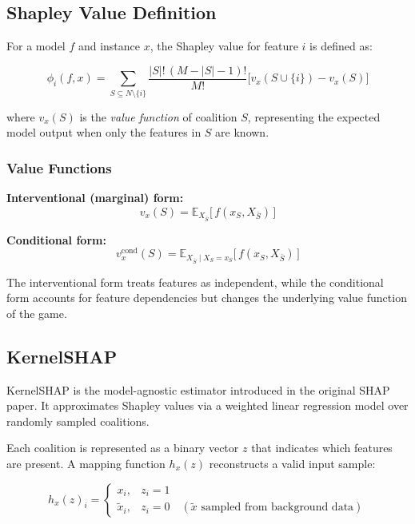 \subsection{Shapley Value Definition}

For a model $f$ and instance $x$, the Shapley value for feature $i$ is defined as:

\begin{equation}
\phi_i(f, x) = 
\sum_{S \subseteq N \setminus \{i\}}
\frac{|S|!\,(M-|S|-1)!}{M!}
\big[v_x(S \cup \{i\}) - v_x(S)\big]
\end{equation}

where $v_x(S)$ is the \textit{value function} of coalition $S$, representing the expected model output when only the features in $S$ are known.

\subsubsection*{Value Functions}

\textbf{Interventional (marginal) form:}
\begin{equation}
v_x(S) = \mathbb{E}_{X_{\bar S}}\!\big[\, f(x_S, X_{\bar S}) \,\big]
\end{equation}

\textbf{Conditional form:}
\begin{equation}
v_x^{\text{cond}}(S) = \mathbb{E}_{X_{\bar S}\mid X_S = x_S}\!\big[\, f(x_S, X_{\bar S}) \,\big]
\end{equation}

The interventional form treats features as independent, while the conditional form accounts for feature dependencies but changes the underlying value function of the game.

\subsection{KernelSHAP}

KernelSHAP is the model-agnostic estimator introduced in the original SHAP paper.  
It approximates Shapley values via a weighted linear regression model over randomly sampled coalitions.

Each coalition is represented as a binary vector $z$ that indicates which features are present.  
A mapping function $h_x(z)$ reconstructs a valid input sample:

\begin{equation}
h_x(z)_i = 
\begin{cases}
x_i, & z_i = 1 \\
\tilde{x}_i, & z_i = 0 \quad (\tilde{x} \text{ sampled from background data})
\end{cases}
\end{equation}

